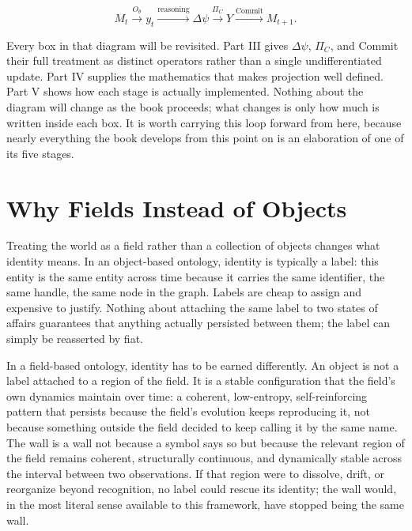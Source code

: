 \[ M_t \xrightarrow{O_\theta} y_t \xrightarrow{\text{reasoning}} \Delta\psi \xrightarrow{\Pi_C} Y \xrightarrow{\text{Commit}} M_{t+1}. \]

Every box in that diagram will be revisited. Part III gives \(\Delta\psi\), \(\Pi_C\), and Commit their full treatment as distinct operators rather than a single undifferentiated update. Part IV supplies the mathematics that makes projection well defined. Part V shows how each stage is actually implemented. Nothing about the diagram will change as the book proceeds; what changes is only how much is written inside each box. It is worth carrying this loop forward from here, because nearly everything the book develops from this point on is an elaboration of one of its five stages.

\section{Why Fields Instead of Objects}

Treating the world as a field rather than a collection of objects changes what identity means. In an object-based ontology, identity is typically a label: this entity is the same entity across time because it carries the same identifier, the same handle, the same node in the graph. Labels are cheap to assign and expensive to justify. Nothing about attaching the same label to two states of affairs guarantees that anything actually persisted between them; the label can simply be reasserted by fiat.

In a field-based ontology, identity has to be earned differently. An object is not a label attached to a region of the field. It is a stable configuration that the field's own dynamics maintain over time: a coherent, low-entropy, self-reinforcing pattern that persists because the field's evolution keeps reproducing it, not because something outside the field decided to keep calling it by the same name. The wall is a wall not because a symbol says so but because the relevant region of the field remains coherent, structurally continuous, and dynamically stable across the interval between two observations. If that region were to dissolve, drift, or reorganize beyond recognition, no label could rescue its identity; the wall would, in the most literal sense available to this framework, have stopped being the same wall.

